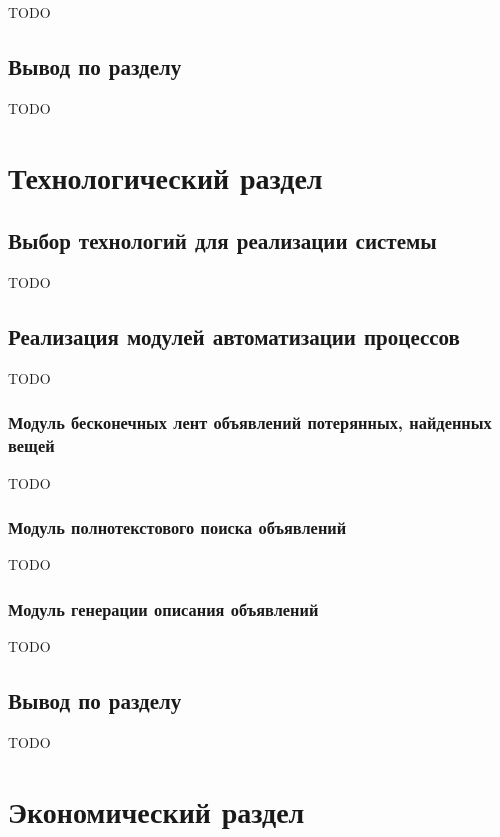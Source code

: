 \documentclass{mirea}
\begin{document}
TODO

\subsection*{Вывод по разделу}

TODO

\section{Технологический раздел}

\subsection{Выбор технологий для реализации системы}

TODO

\subsection{Реализация модулей автоматизации процессов}

TODO

\subsubsection{Модуль бесконечных лент объявлений потерянных, найденных вещей}

TODO

\subsubsection{Модуль полнотекстового поиска объявлений}

TODO

\subsubsection{Модуль генерации описания объявлений}

TODO

\subsection*{Вывод по разделу}

TODO

\section{Экономический раздел}
\end{document}
